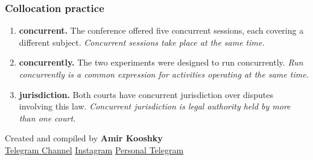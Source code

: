\documentclass[11pt]{article}
\begin{document}
\subsubsection{Collocation practice}
\begin{enumerate}
  \item \textbf{concurrent.} The conference offered five concurrent sessions, each covering a different subject. \emph{Concurrent sessions take place at the same time.}
  \item \textbf{concurrently.} The two experiments were designed to run concurrently. \emph{Run concurrently is a common expression for activities operating at the same time.}
  \item \textbf{jurisdiction.} Both courts have concurrent jurisdiction over disputes involving this law. \emph{Concurrent jurisdiction is legal authority held by more than one court.}
\end{enumerate}

\vfill
\begin{center}
\small\color{Muted} Created and compiled by \textbf{Amir Kooshky}\\
\href{https://t.me/KooshkyTOEFL}{Telegram Channel}\quad\textbullet\quad
\href{https://www.instagram.com/kooshkytoefl}{Instagram}\quad\textbullet\quad
\href{https://t.me/KooshkyTOEFL\_pv}{Personal Telegram}
\end{center}
\end{document}
